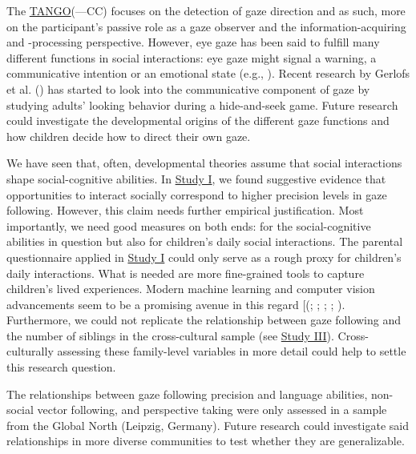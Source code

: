 \documentclass[
]{scrbook}
\begin{document}
The \hyperref[acronyms_TANGO]{TANGO}(---CC) focuses on the detection of gaze direction and as such, more on the participant's passive role as a gaze observer and the information-acquiring and -processing perspective. However, eye gaze has been said to fulfill many different functions in social interactions: eye gaze might signal a warning, a communicative intention or an emotional state (e.g., ). Recent research by Gerlofs et al. () has started to look into the communicative component of gaze by studying adults' looking behavior during a hide-and-seek game. Future research could investigate the developmental origins of the different gaze functions and how children decide how to direct their own gaze.

We have seen that, often, developmental theories assume that social interactions shape social-cognitive abilities. In \hyperref[studyI]{Study I}, we found suggestive evidence that opportunities to interact socially correspond to higher precision levels in gaze following. However, this claim needs further empirical justification. Most importantly, we need good measures on both ends: for the social-cognitive abilities in question but also for children's daily social interactions. The parental questionnaire applied in \hyperref[studyI]{Study I} could only serve as a rough proxy for children's daily interactions. What is needed are more fine-grained tools to capture children's lived experiences. Modern machine learning and computer vision advancements seem to be a promising avenue in this regard {[}(; ; ; ; ). Furthermore, we could not replicate the relationship between gaze following and the number of siblings in the cross-cultural sample (see \hyperref[studyIII]{Study III}). Cross-culturally assessing these family-level variables in more detail could help to settle this research question.

The relationships between gaze following precision and language abilities, non-social vector following, and perspective taking were only assessed in a sample from the Global North (Leipzig, Germany). Future research could investigate said relationships in more diverse communities to test whether they are generalizable.
\end{document}
